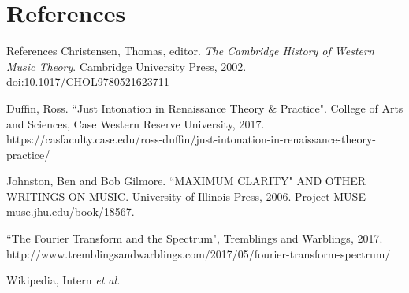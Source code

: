 \documentclass{beamer}
\begin{document}
\section{References}
\begin{frame}{References}
    \footnotesize
    Christensen, Thomas, editor. \textit{The Cambridge History of Western Music Theory}. Cambridge University Press, 2002.  doi:10.1017/CHOL9780521623711
    
    Duffin, Ross. ``Just Intonation in Renaissance Theory \& Practice". College of Arts and Sciences, Case Western Reserve University, 2017. https://casfaculty.case.edu/ross-duffin/just-intonation-in-renaissance-theory-practice/
    
    Johnston, Ben and Bob Gilmore. ``MAXIMUM CLARITY" AND OTHER WRITINGS ON MUSIC. University of Illinois Press, 2006. Project MUSE muse.jhu.edu/book/18567.
    
    ``The Fourier Transform and the Spectrum", Tremblings and Warblings, 2017. http://www.tremblingsandwarblings.com/2017/05/fourier-transform-spectrum/
    
    Wikipedia, Intern \textit{et al.}
\end{frame}
\end{document}
